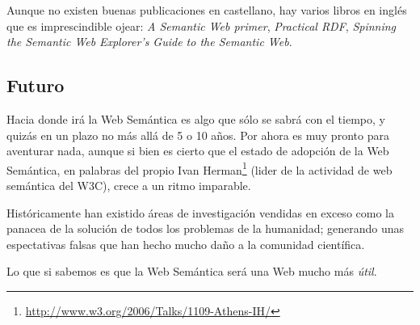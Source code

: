Aunque no existen buenas publicaciones en castellano, hay varios libros en inglés 
que es imprescindible ojear: \emph{A Semantic Web primer}\cite{SemanticWebPrimer},
\emph{Practical RDF}\cite{PracticalRDF}, 
\emph{Spinning the Semantic Web}\cite{SpinningSemanticWeb}
\emph{Explorer's Guide to the Semantic Web}\cite{ExplorerSemanticWeb}.

\subsection{Futuro}

Hacia donde irá la Web Semántica es algo que sólo se sabrá con el tiempo, y quizás
en un plazo no más allá de 5 o 10 años. Por ahora es muy pronto para aventurar nada,
aunque si bien es cierto que el estado de adopción de la Web Semántica, en palabras
del propio Ivan Herman\footnote{\url{http://www.w3.org/2006/Talks/1109-Athens-IH/}}
(lider de la actividad de web semántica del W3C), crece a un ritmo imparable.

Históricamente han existido áreas de investigación vendidas en exceso como la 
panacea de la solución de todos los problemas de la humanidad; generando unas 
espectativas falsas que han hecho mucho daño a la comunidad científica.

Lo que si sabemos es que la Web Semántica será una Web mucho más \emph{útil}.
